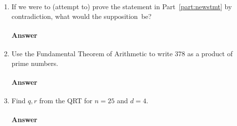 \begin{enumerate}
    \item If we were to (attempt to) prove the statement in
        Part~\ref{part:newstmt} by contradiction, what would the supposition~be?
        \paragraph{Answer}
        \todo{}

    \item Use the Fundamental Theorem of Arithmetic to write $378$ as a product
        of prime numbers.
        \paragraph{Answer}
        \todo{}

    \item Find $q,r$ from the QRT for $n=25$ and $d=4$.
        \paragraph{Answer}
        \todo{}

\end{enumerate}

\collab{\todo{}}

